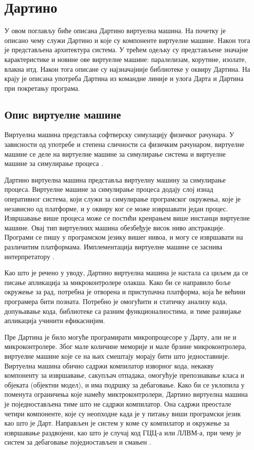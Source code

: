 \documentclass[12pt,oneside]{memoir}
\begin{document}
\chapter{Дартино}
\label{chp:dartino}
У овом поглављу биће описана Дартино виртуелна машина. На почетку је описано чему служи Дартино и које су компоненте виртуелне машине. Након тога је представљена архитектура система. У трећем одељку су представљене значајне карактеристике и новине ове виртуелне машине: паралелизам, корутине, изолате, влакна итд. Након тога описане су најзначајније библиотеке у оквиру Дартина. На крају је описана употреба Дартина из командне линије и улога Дарта и Дартина при покретању програма.
\section{Опис виртуелне машине}

Виртуелна машина представља софтверску симулацију физичког рачунара. У зависности од употребе и степена сличности са физичким рачунаром, виртуелне машине се деле на виртуелне машине за симулирање система и виртуелне машине за симулирање процеса \cite{virtuelna_masina}.

Дартино виртуелна машина представља виртуелну машину за симулирање процеса. Виртуелне машине за симулирање процеса додају слој изнад оперативног система, који служи за симулирање програмског окружења, које је независно од платформе, и у оквиру ког се може извршавати један процес. Извршавање више процеса може се постићи креирањем више инстанци виртуелне машине. Овај тип виртуелних машина обезбеђује висок ниво апстракције. Програми се пишу у програмском језику вишег нивоа, и могу се извршавати на различитим платформама. Имплементација виртуелне машине се заснива интерпретатору \cite{virtuelna_masina}.

Као што је речено у уводу, Дартино виртуелна машина је настала са циљем да се писање апликација за микроконтролере олакша. Како би се направило боље окружење за рад, потребна је отворена и приступачна платформа, која ће већини програмера бити позната. Потребно је омогућити и статичку анализу кода, допуњавање кода, библиотеке са разним функционалностима, и тиме развијање апликација учинити ефикаснијим.

Пре Дартина је било могуће програмирати микропроцесоре у Дарту, али не и микроконтролере. Због мале количине меморије и мале брзине микроконтролера, виртуелне машине које се на њих смештају морају бити што једноставније. Виртуелна машина обично садржи компилатор изворног кода, некакву компоненту за извршавање, сакупљач отпадака, омогућује препознавање класа и објеката (објектни модел), и има подршку за дебаговање. Како би се уклопила у поменута ограничења које намећу миктроконтролери, Дартино виртуелна машина је поједностављена тиме што не садржи компилатор. Она садржи преостале четири компоненте, које су неопходне када је у питању виши програмски језик као што је Дарт. Направљен је систем у коме су компилатор и окружење за извршавање раздвојени, као што је случај код ГЦЦ-а или ЛЛВМ-а, при чему је систем за дебаговање поједностављен и смањен \cite{Dartino}.
\end{document}
